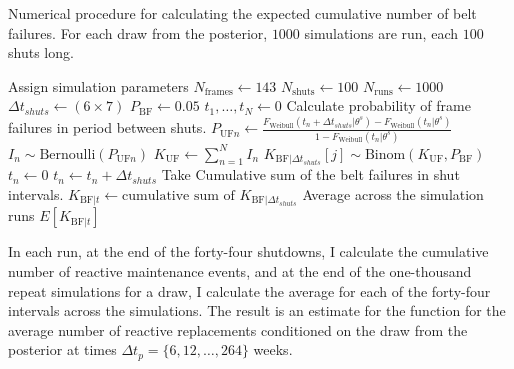 \begin{algorithm}
	\caption{Numerical procedure for calculating the expected cumulative number of belt failures. For each draw from the posterior, $1000$ simulations are run, each $100$ shuts long.}
  \label{algo:K_BF}
	\begin{algorithmic}[1]
    \State Assign simulation parameters
    \State $N_{\text{frames}} \gets 143$         
    \State $N_{\text{shuts}} \gets 100$          
    \State $N_{\text{runs}} \gets 1000$          
    \State $\Delta t_{shuts} \gets (6 \times 7)$ 
    \State $P_{\text{BF}} \gets 0.05$            
    \State
        \State $t_1, \dots, t_N \gets 0$         
          \State Calculate probability of frame failures in period between shuts.
          \State $P_{\text{UF} n} \gets \frac{F_{\text{Weibull}}(t_n + \Delta t_{shuts} | \theta^s) - F_{\text{Weibull}}(t_n | \theta^s)}{1 - F_{\text{Weibull}}(t_n | \theta^s)}$
          \State $I_n \sim \mbox{Bernoulli}(P_{\text{UF} n})$   
          \State $K_{\text{UF}} \gets \sum^N_{n = 1} I_n$       
          \State $K_{\text{BF}|\Delta t_{shuts}}[j] \sim \mbox{Binom}(K_{\text{UF}}, P_{\text{BF}})$ 
              \State $t_n \gets 0$   
            \Else
              \State $t_n \gets t_n + \Delta t_{shuts}$   
            \EndIf
          \EndFor
        \EndFor
        \State Take Cumulative sum of the belt failures in shut intervals.
        \State $K_{\text{BF}|t} \gets \text{cumulative sum of } K_{\text{BF}|\Delta t_{shuts}}$
      \EndFor
    \State Average across the simulation runs
    \State $E[K_{\text{BF}|t}]$
    \EndFor
	\end{algorithmic} 
\end{algorithm} 

In each run, at the end of the forty-four shutdowns, I calculate the cumulative number of reactive maintenance events, and at the end of the one-thousand repeat simulations for a draw, I calculate the average for each of the forty-four intervals across the simulations. The result is an estimate for the function for the average number of reactive replacements conditioned on the draw from the posterior at times $\Delta t_p = \{6, 12, \dots, 264\}$ weeks.

